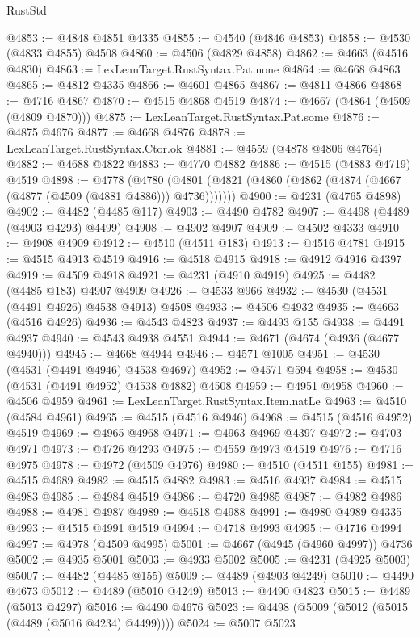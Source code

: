 \begin{lexlean}{RustStd}
\begin{coremodule}
{\begin{coremodule}
{{{{{{{{{{{{{{{{{{{{{{{{{{{{{{{{{{{{{{{{{{{{{{{{{{{{{{{@4853 := @4848 @4851 @4335
@4855 := @4540 (@4846 @4853)
@4858 := @4530 (@4833 @4855) @4508
@4860 := @4506 (@4829 @4858)
@4862 := @4663 (@4516 @4830)
@4863 := LexLeanTarget.RustSyntax.Pat.none
@4864 := @4668 @4863
@4865 := @4812 @4335
@4866 := @4601 @4865
@4867 := @4811 @4866
@4868 := @4716 @4867
@4870 := @4515 @4868 @4519
@4874 := @4667 (@4864 (@4509 (@4809 @4870)))
@4875 := LexLeanTarget.RustSyntax.Pat.some
@4876 := @4875 @4676
@4877 := @4668 @4876
@4878 := LexLeanTarget.RustSyntax.Ctor.ok
@4881 := @4559 (@4878 @4806 @4764)
@4882 := @4688 @4822
@4883 := @4770 @4882
@4886 := @4515 (@4883 @4719) @4519
@4898 := @4778
    (@4780 (@4801 (@4821 (@4860 (@4862 (@4874 (@4667 (@4877 (@4509 (@4881 @4886))) @4736)))))))
@4900 := @4231 (@4765 @4898)
@4902 := @4482 (@4485 @117)
@4903 := @4490 @4782
@4907 := @4498 (@4489 (@4903 @4293) @4499)
@4908 := @4902 @4907
@4909 := @4502 @4333
@4910 := @4908 @4909
@4912 := @4510 (@4511 @183)
@4913 := @4516 @4781
@4915 := @4515 @4913 @4519
@4916 := @4518 @4915
@4918 := @4912 @4916 @4397
@4919 := @4509 @4918
@4921 := @4231 (@4910 @4919)
@4925 := @4482 (@4485 @183) @4907 @4909
@4926 := @4533 @966
@4932 := @4530 (@4531 (@4491 @4926) @4538 @4913) @4508
@4933 := @4506 @4932
@4935 := @4663 (@4516 @4926)
@4936 := @4543 @4823
@4937 := @4493 @155
@4938 := @4491 @4937
@4940 := @4543 @4938 @4551
@4944 := @4671 (@4674 (@4936 (@4677 @4940)))
@4945 := @4668 @4944
@4946 := @4571 @1005
@4951 := @4530 (@4531 (@4491 @4946) @4538 @4697)
@4952 := @4571 @594
@4958 := @4530 (@4531 (@4491 @4952) @4538 @4882) @4508
@4959 := @4951 @4958
@4960 := @4506 @4959
@4961 := LexLeanTarget.RustSyntax.Item.natLe
@4963 := @4510 (@4584 @4961)
@4965 := @4515 (@4516 @4946)
@4968 := @4515 (@4516 @4952) @4519
@4969 := @4965 @4968
@4971 := @4963 @4969 @4397
@4972 := @4703 @4971
@4973 := @4726 @4293
@4975 := @4559 @4973 @4519
@4976 := @4716 @4975
@4978 := @4972 (@4509 @4976)
@4980 := @4510 (@4511 @155)
@4981 := @4515 @4689
@4982 := @4515 @4882
@4983 := @4516 @4937
@4984 := @4515 @4983
@4985 := @4984 @4519
@4986 := @4720 @4985
@4987 := @4982 @4986
@4988 := @4981 @4987
@4989 := @4518 @4988
@4991 := @4980 @4989 @4335
@4993 := @4515 @4991 @4519
@4994 := @4718 @4993
@4995 := @4716 @4994
@4997 := @4978 (@4509 @4995)
@5001 := @4667 (@4945 (@4960 @4997)) @4736
@5002 := @4935 @5001
@5003 := @4933 @5002
@5005 := @4231 (@4925 @5003)
@5007 := @4482 (@4485 @155)
@5009 := @4489 (@4903 @4249)
@5010 := @4490 @4673
@5012 := @4489 (@5010 @4249)
@5013 := @4490 @4823
@5015 := @4489 (@5013 @4297)
@5016 := @4490 @4676
@5023 := @4498 (@5009 (@5012 (@5015 (@4489 (@5016 @4234) @4499))))
@5024 := @5007 @5023
}}}}}}}}}}}}}}}}}}}}}}}}}}}}}}}}}}}}}}}}}}}}}}}}}}}}}}}
\end{coremodule}}
\end{coremodule}
\end{lexlean}
